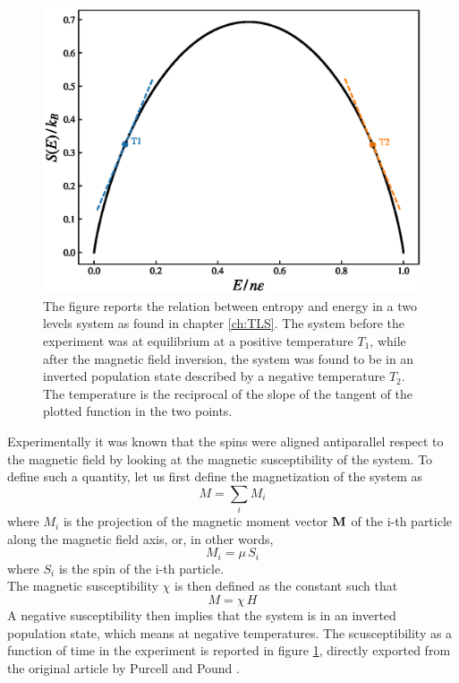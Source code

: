 \begin{figure}[h]
    \centering 
    \includegraphics[scale=0.6]{./images/PandP_states.eps}
    \caption{The figure reports the relation between entropy and energy in a two levels system as found in chapter \ref{ch:TLS}. The system before the experiment was at equilibrium at a positive temperature $T_1$, while after the magnetic field inversion, the system 
    was found to be in an inverted population state described by a negative temperature $T_2$. The temperature is the reciprocal of the slope of the tangent of the plotted function in the two points.}
    \label{fig:PandP_switch}
\end{figure}
Experimentally it was known that the spins were aligned antiparallel respect to the magnetic field by looking at the magnetic susceptibility of the system. To define such a quantity, let us first define the magnetization of the system as
\begin{equation}
    M = \sum_i M_i
\end{equation}
where $M_i$ is the projection of the magnetic moment vector $\mathbf{M}$ of the i-th particle along the magnetic field axis, or, in other words,
\begin{equation*}
    M_i = \mu \, S_i
\end{equation*}
where $S_i$ is the spin of the i-th particle. \\
The magnetic susceptibility $\chi$ is then defined as the constant such that
\begin{equation*}
    M = \chi \, H
\end{equation*}
A negative susceptibility then implies that the system is in an inverted population state, which means at negative temperatures. The scusceptibility as a function of time in the experiment is reported in figure \ref{fig:PandP_switch}, directly exported from the original article by Purcell and Pound \cite{PandP}.
